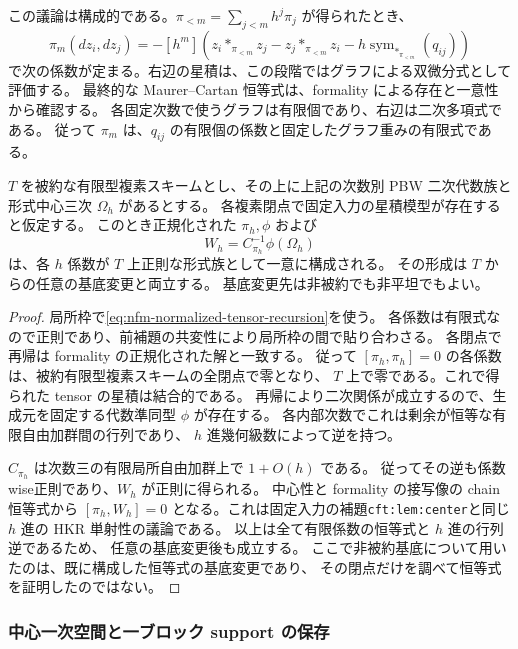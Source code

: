 この議論は構成的である。$\pi_{<m}=\sum_{j<m}h^j\pi_j$ が得られたとき、
\begin{equation}
\label{eq:nfm-normalized-tensor-recursion}
 \pi_m(dz_i,dz_j)=
 -[h^m]\left(
 z_i*_{\pi_{<m}}z_j-z_j*_{\pi_{<m}}z_i
 -h\operatorname{sym}_{*_{\pi_{<m}}}(q_{ij})\right)
\end{equation}
で次の係数が定まる。右辺の星積は、この段階ではグラフによる双微分式として評価する。
最終的な Maurer--Cartan 恒等式は、formality による存在と一意性から確認する。
各固定次数で使うグラフは有限個であり、右辺は二次多項式である。
従って $\pi_m$ は、$q_{ij}$ の有限個の係数と固定したグラフ重みの有限式である。

\begin{proposition}[普遍係数上での正則性と基底変更]
\label{prop:nfm-normalized-model-basechange}
$T$ を被約な有限型複素スキームとし、その上に上記の次数別 PBW 二次代数族と
形式中心三次 $\Omega_h$ があるとする。
各複素閉点で固定入力の星積模型が存在すると仮定する。
このとき正規化された $\pi_h,\phi$ および
\[
 W_h=C_{\pi_h}^{-1}\phi(\Omega_h)
\]
は、各 $h$ 係数が $T$ 上正則な形式族として一意に構成される。
その形成は $T$ からの任意の基底変更と両立する。
基底変更先は非被約でも非平坦でもよい。
\end{proposition}

\begin{proof}
局所枠で\eqref{eq:nfm-normalized-tensor-recursion}を使う。
各係数は有限式なので正則であり、前補題の共変性により局所枠の間で貼り合わさる。
各閉点で再帰は formality の正規化された解と一致する。
従って $[\pi_h,\pi_h]=0$ の各係数は、被約有限型複素スキームの全閉点で零となり、
$T$ 上で零である。これで得られた tensor の星積は結合的である。
再帰により二次関係が成立するので、生成元を固定する代数準同型 $\phi$ が存在する。
各内部次数でこれは剰余が恒等な有限自由加群間の行列であり、
$h$ 進幾何級数によって逆を持つ。

$C_{\pi_h}$ は次数三の有限局所自由加群上で $1+O(h)$ である。
従ってその逆も係数wise正則であり、$W_h$ が正則に得られる。
中心性と formality の接写像の chain 恒等式から
$[\pi_h,W_h]=0$ となる。これは固定入力の補題\texttt{cft:lem:center}と同じ
$h$ 進の HKR 単射性の議論である。
以上は全て有限係数の恒等式と $h$ 進の行列逆であるため、
任意の基底変更後も成立する。
ここで非被約基底について用いたのは、既に構成した恒等式の基底変更であり、
その閉点だけを調べて恒等式を証明したのではない。
\end{proof}

\subsubsection{中心一次空間と一ブロック support の保存}

